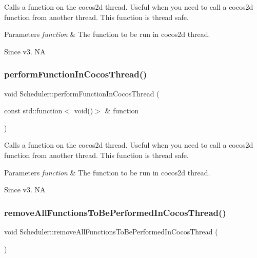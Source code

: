Calls a function on the cocos2d thread. Useful when you need to call a cocos2d function from another thread. This function is thread safe. 
\begin{DoxyParams}{Parameters}
{\em function} & The function to be run in cocos2d thread. \\
\hline
\end{DoxyParams}
\begin{DoxySince}{Since}
v3.  NA 
\end{DoxySince}
\mbox{\label{classScheduler_acd6da28a03a7f8b9df377f1e05e7883f}} 
\subsubsection{\texorpdfstring{perform\+Function\+In\+Cocos\+Thread()}{performFunctionInCocosThread()}\hspace{0.1cm}{\footnotesize\ttfamily [2/2]}}
{\footnotesize\ttfamily void Scheduler\+::perform\+Function\+In\+Cocos\+Thread (\begin{DoxyParamCaption}\item[{const std\+::function$<$ void()$>$ \&}]{function }\end{DoxyParamCaption})}

Calls a function on the cocos2d thread. Useful when you need to call a cocos2d function from another thread. This function is thread safe. 
\begin{DoxyParams}{Parameters}
{\em function} & The function to be run in cocos2d thread. \\
\hline
\end{DoxyParams}
\begin{DoxySince}{Since}
v3.  NA 
\end{DoxySince}
\mbox{\label{classScheduler_a8872d90ed82fdb19f93f9bd30e2837aa}} 
\subsubsection{\texorpdfstring{remove\+All\+Functions\+To\+Be\+Performed\+In\+Cocos\+Thread()}{removeAllFunctionsToBePerformedInCocosThread()}}
{\footnotesize\ttfamily void Scheduler\+::remove\+All\+Functions\+To\+Be\+Performed\+In\+Cocos\+Thread (\begin{DoxyParamCaption}{ }\end{DoxyParamCaption})}

